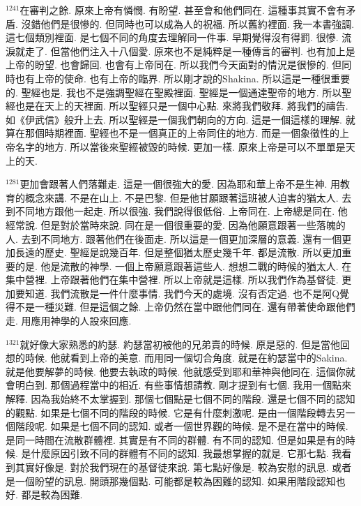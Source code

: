 \documentclass{book}
\begin{document}
$^{1241}$在審判之餘.
原來上帝有憐憫.
有盼望.
甚至會和他們同在.
這種事其實不會有矛盾.
沒錯他們是很慘的.
但同時也可以成為人的祝福.
所以舊約裡面.
我一本書強調.
這七個類別裡面.
是七個不同的角度去理解同一件事.
早期覺得沒有得罰.
很慘.
流淚就走了.
但當他們注入十八個愛.
原來也不是純粹是一種傳言的審判.
也有加上是上帝的盼望.
也會歸回.
也會有上帝同在.
所以我們今天面對的情況是很慘的.
但同時也有上帝的使命.
也有上帝的臨界.
所以剛才說的Shakina.
所以這是一種很重要的.
聖經也是.
我也不是強調聖經在聖殿裡面.
聖經是一個通達聖帝的地方.
所以聖經也是在天上的天裡面.
所以聖經只是一個中心點.
來將我們敬拜.
將我們的禱告.
如《伊武信》般升上去.
所以聖經是一個我們朝向的方向.
這是一個這樣的理解.
就算在那個時期裡面.
聖經也不是一個真正的上帝同住的地方.
而是一個象徵性的上帝名字的地方.
所以當後來聖經被毀的時候.
更加一樣.
原來上帝是可以不單單是天上的天.

$^{1281}$更加會跟著人們落難走.
這是一個很強大的愛.
因為耶和華上帝不是生神.
用教育的概念來講.
不是在山上.
不是巴黎.
但是他甘願跟著這班被人迫害的猶太人.
去到不同地方跟他一起走.
所以很強.
我們說得很低俗.
上帝同在.
上帝總是同在.
他經常說.
但是對於當時來說.
同在是一個很重要的愛.
因為他願意跟著一些落魄的人.
去到不同地方.
跟著他們在後面走.
所以這是一個更加深層的意義.
還有一個更加長遠的歷史.
聖經是說幾百年.
但是整個猶太歷史幾千年.
都是流散.
所以更加重要的是.
他是流散的神學.
一個上帝願意跟著這些人.
想想二戰的時候的猶太人.
在集中營裡.
上帝跟著他們在集中營裡.
所以上帝就是這樣.
所以我們作為基督徒.
更加要知道.
我們流散是一件什麼事情.
我們今天的處境.
沒有否定過.
也不是阿Q覺得不是一種災難.
但是這個之餘.
上帝仍然在當中跟他們同在.
還有帶著使命跟他們走.
用應用神學的人設來回應.

$^{1321}$就好像大家熟悉的約瑟.
約瑟當初被他的兄弟賣的時候.
原是惡的.
但是當他回想的時候.
他就看到上帝的美意.
而用同一個切合角度.
就是在約瑟當中的Sakina.
就是他要解夢的時候.
他要去執政的時候.
他就感受到耶和華神與他同在.
這個你就會明白到.
那個過程當中的相近.
有些事情想請教.
剛才提到有七個.
我用一個點來解釋.
因為我始終不太掌握到.
那個七個點是七個不同的階段.
還是七個不同的認知的觀點.
如果是七個不同的階段的時候.
它是有什麼刺激呢.
是由一個階段轉去另一個階段呢.
如果是七個不同的認知.
或者一個世界觀的時候.
是不是在當中的時候.
是同一時間在流散群體裡.
其實是有不同的群體.
有不同的認知.
但是如果是有的時候.
是什麼原因引致不同的群體有不同的認知.
我最想掌握的就是.
它那七點.
我看到其實好像是.
對於我們現在的基督徒來說.
第七點好像是.
較為安慰的訊息.
或者是一個盼望的訊息.
開頭那幾個點.
可能都是較為困難的認知.
如果用階段認知也好.
都是較為困難.
\end{document}
